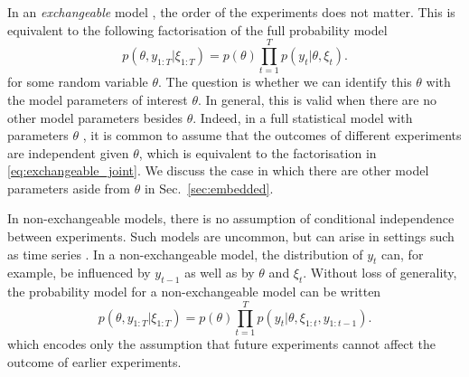 \documentclass[a4paper, 10pt]{report}
\theoremstyle{plain}
\begin{document}
	In an \emph{exchangeable} model \citep{bloem2019probabilistic}, the order of the experiments does not matter. This is equivalent \citep{oksendal2003stochastic} to the following factorisation of the full probability model
	\begin{equation}
	\label{eq:exchangeable_joint}
	p(\theta,y_{1:T}|\xi_{1:T}) = p(\theta)\prod_{t=1}^T p(y_t|\theta,\xi_t).
	\end{equation}
	for some random variable $\theta$.
	The question is whether we can identify this $\theta$ with the model parameters of interest $\theta$.
	In general, this is valid when there are no other model parameters besides $\theta$.
	Indeed, in a full statistical model with parameters $\theta$ \citep{cox2006principles}, it is common to assume that the outcomes of different experiments are independent given $\theta$, which is equivalent to the factorisation in \eqref{eq:exchangeable_joint}.
	We discuss the case in which there are other model parameters aside from $\theta$ in Sec.~\ref{sec:embedded}.
	
	In non-exchangeable models, there is no assumption of conditional independence between experiments.
	Such models are uncommon, but can arise in settings such as time series \citep{pole2018applied}. In a non-exchangeable model, the distribution of $y_t$ can, for example, be influenced by $y_{t-1}$ as well as by $\theta$ and $\xi_t$. Without loss of generality, the probability model for a non-exchangeable model can be written
	\begin{equation}
	p(\theta,y_{1:T}|\xi_{1:T}) = p(\theta)\prod_{t=1}^T p(y_t|\theta,\xi_{1:t},y_{1:t-1}).
	\end{equation}
	which encodes only the assumption that future experiments cannot affect the outcome of earlier experiments. 
	
\end{document}
